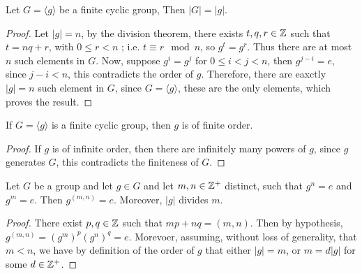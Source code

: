 \begin{lemma}\label{lemma_2.3.3}
  Let $G=\langle g \rangle$ be a finite cyclic group, Then $|G|=|g|$.
\end{lemma}
\begin{proof}
  Let $|g|=n$, by the division theorem, there exists $t,q,r \in \mathbb{Z}$ such
  that  $t=nq+r$, with $0 \leq r < n$ ; i.e. $ t \equiv r \mod{n}$, so
  $g^t=g^r$. Thus there are at most  $n$ such elements in  $G$. Now, suppose
  $g^i=g^j$ for  $0 \leq i < j < n$, then  $g^{j-i}=e$, since $j-i < n$, this
  contradicts the order of  $g$. Therefore, there are eaxctly $|g|=n$ such
  element in $G$, since  $G=\langle g \rangle$, these are the only elements, which
  proves the result.
\end{proof}
\begin{corollary}
  If $G=\langle g \rangle$ is a finite cyclic group, then $g$ is of finite order.
\end{corollary}
\begin{proof}
  If $g$ is of infinite order, then there are infinitely many powers of $g$,
  since $g$ generates  $G$, this contradicts the finiteness of  $G$.
\end{proof}

\begin{lemma}\label{lemma_2.3.4}
  Let $G$ be a group and let  $g \in G$ and let  $m,n \in \mathbb{Z}^+$ distinct, such
  that  $g^n=e$ and  $g^m=e$. Then  $g^{(m,n)}=e$. Moreover, $|g|$
  divides $m$.
\end{lemma}
\begin{proof}
  There exist $p,q \in \mathbb{Z}$ such that $mp+nq=(m,n)$. Then by hypothesis,
  $g^{(m,n)}=(g^m)^p(g^n)^q=e$. Morevoer, assuming, without loss of
  generality, that $m<n$, we have by definition of the order of  $g$ that
  either $|g|=m$, or $m=d|g|$ for some $d \in \mathbb{Z}^+$.
\end{proof}

